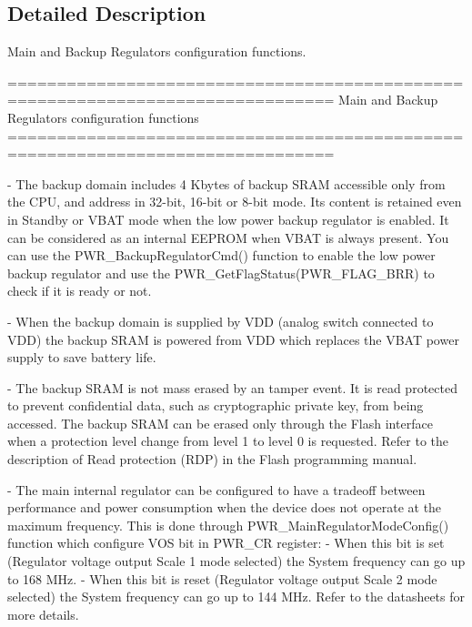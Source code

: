 \subsection{Detailed Description}
Main and Backup Regulators configuration functions. \begin{DoxyVerb} ===============================================================================
                    Main and Backup Regulators configuration functions
 ===============================================================================  

 - The backup domain includes 4 Kbytes of backup SRAM accessible only from the 
   CPU, and address in 32-bit, 16-bit or 8-bit mode. Its content is retained 
   even in Standby or VBAT mode when the low power backup regulator is enabled. 
   It can be considered as an internal EEPROM when VBAT is always present.
   You can use the PWR_BackupRegulatorCmd() function to enable the low power
   backup regulator and use the PWR_GetFlagStatus(PWR_FLAG_BRR) to check if it is
   ready or not. 

 - When the backup domain is supplied by VDD (analog switch connected to VDD) 
   the backup SRAM is powered from VDD which replaces the VBAT power supply to 
   save battery life.

 - The backup SRAM is not mass erased by an tamper event. It is read protected 
   to prevent confidential data, such as cryptographic private key, from being 
   accessed. The backup SRAM can be erased only through the Flash interface when
   a protection level change from level 1 to level 0 is requested. 
   Refer to the description of Read protection (RDP) in the Flash programming manual.

 - The main internal regulator can be configured to have a tradeoff between performance
   and power consumption when the device does not operate at the maximum frequency. 
   This is done through PWR_MainRegulatorModeConfig() function which configure VOS bit
   in PWR_CR register: 
      - When this bit is set (Regulator voltage output Scale 1 mode selected) the System
        frequency can go up to 168 MHz. 
      - When this bit is reset (Regulator voltage output Scale 2 mode selected) the System
        frequency can go up to 144 MHz. 
   Refer to the datasheets for more details.\end{DoxyVerb}
 


